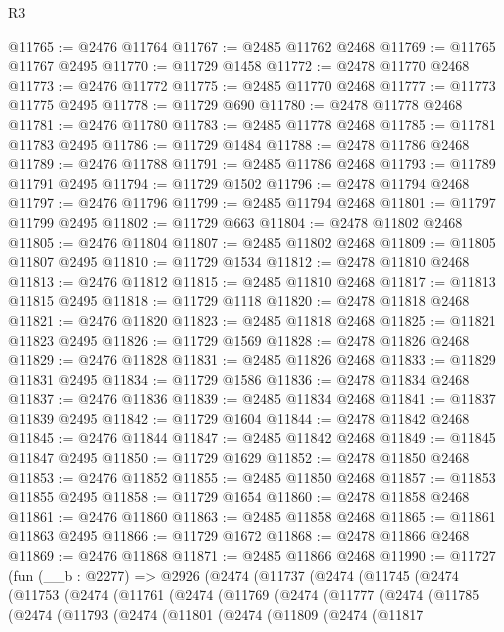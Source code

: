 \begin{lexlean}{R3}
\begin{coremodule}
@11765 := @2476 @11764
@11767 := @2485 @11762 @2468
@11769 := @11765 @11767 @2495
@11770 := @11729 @1458
@11772 := @2478 @11770 @2468
@11773 := @2476 @11772
@11775 := @2485 @11770 @2468
@11777 := @11773 @11775 @2495
@11778 := @11729 @690
@11780 := @2478 @11778 @2468
@11781 := @2476 @11780
@11783 := @2485 @11778 @2468
@11785 := @11781 @11783 @2495
@11786 := @11729 @1484
@11788 := @2478 @11786 @2468
@11789 := @2476 @11788
@11791 := @2485 @11786 @2468
@11793 := @11789 @11791 @2495
@11794 := @11729 @1502
@11796 := @2478 @11794 @2468
@11797 := @2476 @11796
@11799 := @2485 @11794 @2468
@11801 := @11797 @11799 @2495
@11802 := @11729 @663
@11804 := @2478 @11802 @2468
@11805 := @2476 @11804
@11807 := @2485 @11802 @2468
@11809 := @11805 @11807 @2495
@11810 := @11729 @1534
@11812 := @2478 @11810 @2468
@11813 := @2476 @11812
@11815 := @2485 @11810 @2468
@11817 := @11813 @11815 @2495
@11818 := @11729 @1118
@11820 := @2478 @11818 @2468
@11821 := @2476 @11820
@11823 := @2485 @11818 @2468
@11825 := @11821 @11823 @2495
@11826 := @11729 @1569
@11828 := @2478 @11826 @2468
@11829 := @2476 @11828
@11831 := @2485 @11826 @2468
@11833 := @11829 @11831 @2495
@11834 := @11729 @1586
@11836 := @2478 @11834 @2468
@11837 := @2476 @11836
@11839 := @2485 @11834 @2468
@11841 := @11837 @11839 @2495
@11842 := @11729 @1604
@11844 := @2478 @11842 @2468
@11845 := @2476 @11844
@11847 := @2485 @11842 @2468
@11849 := @11845 @11847 @2495
@11850 := @11729 @1629
@11852 := @2478 @11850 @2468
@11853 := @2476 @11852
@11855 := @2485 @11850 @2468
@11857 := @11853 @11855 @2495
@11858 := @11729 @1654
@11860 := @2478 @11858 @2468
@11861 := @2476 @11860
@11863 := @2485 @11858 @2468
@11865 := @11861 @11863 @2495
@11866 := @11729 @1672
@11868 := @2478 @11866 @2468
@11869 := @2476 @11868
@11871 := @2485 @11866 @2468
@11990 := @11727
    (fun (__b : @2277) =>
    @2926
      (@2474
        (@11737
          (@2474
            (@11745
              (@2474
                (@11753
                  (@2474
                    (@11761
                      (@2474
                        (@11769
                          (@2474
                            (@11777
                              (@2474
                                (@11785
                                  (@2474
                                    (@11793
                                      (@2474
                                        (@11801
                                          (@2474
                                            (@11809
                                              (@2474
                                                (@11817

\end{coremodule}
\end{lexlean}
